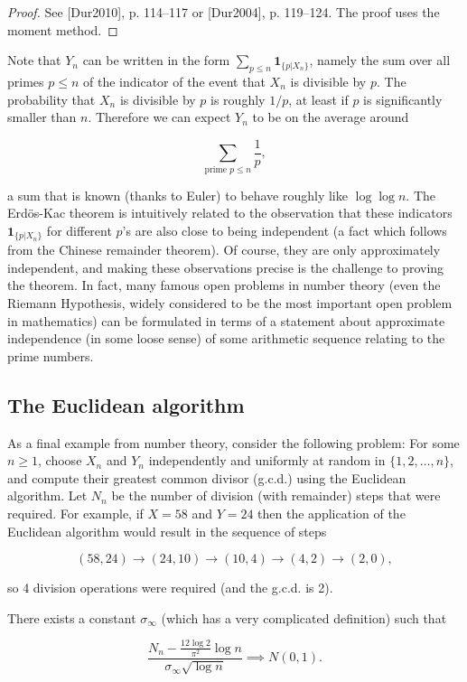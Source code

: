\begin{proof}
See [Dur2010], p. 114--117 or [Dur2004], p. 119--124.
The proof uses the moment method.
\end{proof}

\noindent Note that $Y_n$ can be written in the form
$\sum_{p\le n} \mathbf{1}_{\{p | X_n\}}$, namely the
sum over all primes $p\le n$ of the indicator of the
event that $X_n$ is divisible by $p$. The probability
that $X_n$ is divisible by $p$ is roughly $1/p$, at
least if $p$ is significantly smaller than $n$.
Therefore we can expect $Y_n$  to be on the average
around

\[
\sum_{\textrm{prime }p\le n} \frac{1}{p},
\]

\noindent a sum that is known (thanks to Euler) to behave
roughly like $\log\log n$. The Erdös-Kac theorem is
intuitively related to the observation that these
indicators $\mathbf{1}_{\{p | X_n\}}$ for different
$p$'s are also close to being independent (a fact
which follows from the Chinese remainder theorem). Of
course, they are only approximately independent, and
making these observations precise is the challenge to
proving the theorem. In fact, many famous open
problems in number theory (even the Riemann
Hypothesis, widely considered to be the most important
open problem in mathematics) can be formulated in
terms of a statement about approximate independence
(in some loose sense) of some arithmetic sequence
relating to the prime numbers.

\subsection{The Euclidean algorithm}

As a final example from number theory, consider the
following problem: For some $n\ge 1$, choose $X_n$
and $Y_n$ independently and uniformly at random in
$\{1,2,\ldots,n\}$, and compute their greatest common
divisor (g.c.d.) using the Euclidean algorithm. Let
$N_n$ be the number of division (with remainder)
steps that were required. For example, if $X = 58$
and $Y=24$ then the application of the Euclidean
algorithm would result in the sequence of steps

\[
(58,24) \to (24,10) \to (10,4) \to (4,2) \to (2,0),
\]

\noindent so 4 division operations were required (and the
g.c.d. is 2).

\begin{thm}
There exists a constant $\sigma_\infty$ (which has a
very complicated definition) such that

\[
\frac{N_n - \frac{12 \log 2}{\pi^2} \log n}{\sigma_\infty \sqrt{\log n}} \implies N(0,1).
\]

\end{thm}

